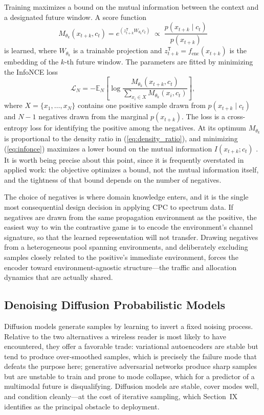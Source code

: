 \documentclass[lettersize,journal]{IEEEtran}
\begin{document}
Training maximizes a bound on the mutual information between the context
and a designated future window. A score function
\begin{equation}
M_{\theta_k}(x_{t+k}, c_t)
 = e^{\left(z_{t+k}^{\mathsf{T}} W_{\theta_k} c_t\right)}
 \;\propto\; \frac{p(x_{t+k} \mid c_t)}{p(x_{t+k})}
\label{eq:density_ratio}
\end{equation}
is learned, where $W_{\theta_k}$ is a trainable projection and
$z_{t+k}^{\mathsf{T}} = f_{\mathrm{enc}}(x_{t+k})$ is the embedding of
the $k$-th future window. The parameters are fitted by minimizing the
InfoNCE loss
\begin{equation}
\mathcal{L}_N = -\mathbb{E}_N\!\left[
\log \frac{M_{\theta_k}(x_{t+k}, c_t)}
{\sum_{x_i \in X} M_{\theta_k}(x_i, c_t)}\right],
\label{eq:infonce}
\end{equation}
where $X = \{x_1, \ldots, x_N\}$ contains one positive sample drawn from
$p(x_{t+k} \mid c_t)$ and $N-1$ negatives drawn from the marginal
$p(x_{t+k})$.
The loss is a cross-entropy loss for identifying the positive
among the negatives.
At its optimum $M_{\theta_k}$ is proportional to the
density ratio in (\ref{eq:density_ratio}), and minimizing
(\ref{eq:infonce}) maximizes a lower bound on the mutual information
$I(x_{t+k}; c_t)$ \cite{Oord2018}.
It is worth being precise about this
point, since it is frequently overstated in applied work: the objective
optimizes a bound, not the mutual information itself, and the tightness
of that bound depends on the number of negatives.

The choice of negatives is where domain knowledge enters, and it is the
single most consequential design decision in applying CPC to spectrum
data.
If negatives are drawn from the same propagation environment as
the positive, the easiest way to win the contrastive game is to encode
the environment's channel signature, so that the learned representation will
not transfer.
Drawing negatives from a heterogeneous pool spanning
environments, and deliberately excluding samples closely related to the
positive's immediate environment, forces the encoder toward
environment-agnostic structure---the traffic and allocation dynamics
that are actually shared.

\subsection{\textbf{Denoising Diffusion Probabilistic Models}}
Diffusion models \cite{SohlDickstein2015, Ho2020} generate samples by
learning to invert a fixed noising process.
Relative to the two alternatives a wireless reader is most likely to
have encountered, they offer a favorable trade: variational autoencoders
\cite{Kingma2014} are stable but tend to produce over-smoothed samples,
which is precisely the failure mode that defeats the purpose here; generative
adversarial networks \cite{Goodfellow2014} produce sharp samples but are
unstable to train and prone to mode collapse, which for a predictor of a
multimodal future is disqualifying.
Diffusion models are stable, cover modes well,
and condition cleanly---at the cost of iterative sampling, which
Section~IX identifies as the principal obstacle to deployment.
\end{document}
